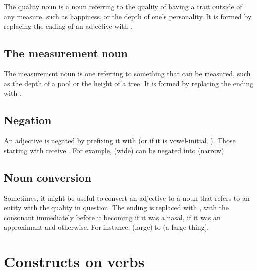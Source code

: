 \documentclass{book}
\begin{document}
The quality noun is a noun referring to the quality of having a trait outside of any measure, such as happiness, or the depth of one's personality. It is formed by replacing the ending of an adjective with .

\subsection{The measurement noun}

The measurement noun is one referring to something that can be measured, such as the depth of a pool or the height of a tree. It is formed by replacing the ending with .

\subsection{Negation}

An adjective is negated by prefixing it with  (or if it is vowel-initial, ). Those starting with  receive . For example,  (wide) can be negated into  (narrow).

\subsection{Noun conversion}

Sometimes, it might be useful to convert an adjective to a noun that refers to an entity with the quality in question. The ending is replaced with , with the consonant immediately before it becoming  if it was a nasal,  if it was an approximant and  otherwise. For instance,  (large) to  (a large thing).

\section{Constructs on verbs}

\label{sec:verbcons}
\end{document}

